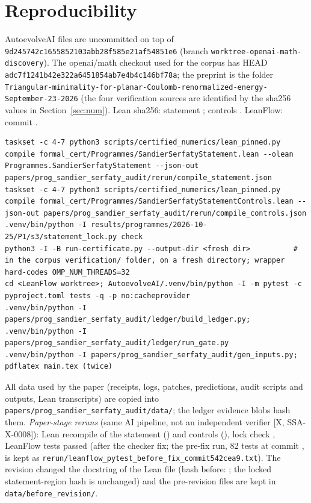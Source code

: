 \documentclass[10pt]{article}
\newcommand{\tier}[1]{\textsf{[#1]}}
\newcommand{\hash}[1]{\texttt{\expandafter\seqsplit\expandafter{#1}}}
\begin{document}
\section{Reproducibility}\label{sec:repro}
AutoevolveAI files are uncommitted on top of \texttt{9d245742c1655852103abb28f585e21af54851e6} (branch \texttt{worktree-openai-math-discovery}). The openai/math checkout used for the corpus has HEAD \texttt{adc7f1241b42e322a6451854ab7e4b4c146bf78a}; the preprint is the folder \texttt{Triangular-minimality-for-planar-Coulomb-renormalized-energy-September-23-2026} (the four verification sources are identified by the sha256 values in Section~\ref{sec:num}). Lean sha256: statement \hash{\SSAShaMain}; controls \hash{\SSAShaCtl}. LeanFlow: commit \hash{\SSALFCommit}.
\begin{lstlisting}[basicstyle=\ttfamily\tiny]
taskset -c 4-7 python3 scripts/certified_numerics/lean_pinned.py compile formal_cert/Programmes/SandierSerfatyStatement.lean --olean Programmes.SandierSerfatyStatement --json-out papers/prog_sandier_serfaty_audit/rerun/compile_statement.json
taskset -c 4-7 python3 scripts/certified_numerics/lean_pinned.py compile formal_cert/Programmes/SandierSerfatyStatementControls.lean --json-out papers/prog_sandier_serfaty_audit/rerun/compile_controls.json
.venv/bin/python -I results/programmes/2026-10-25/P1/s3/statement_lock.py check
python3 -I -B run-certificate.py --output-dir <fresh dir>          # in the corpus verification/ folder, on a fresh directory; wrapper hard-codes OMP_NUM_THREADS=32
cd <LeanFlow worktree>; AutoevolveAI/.venv/bin/python -I -m pytest -c pyproject.toml tests -q -p no:cacheprovider
.venv/bin/python -I papers/prog_sandier_serfaty_audit/ledger/build_ledger.py; .venv/bin/python -I papers/prog_sandier_serfaty_audit/ledger/run_gate.py
.venv/bin/python -I papers/prog_sandier_serfaty_audit/gen_inputs.py; pdflatex main.tex (twice)
\end{lstlisting}
All data used by the paper (receipts, logs, patches, predictions, audit scripts and outputs, Lean transcripts) are copied into \texttt{papers/prog\_sandier\_serfaty\_audit/data/}; the ledger evidence blobs hash them. \emph{Paper-stage reruns} (same AI pipeline, not an independent verifier \tier{X, SSA-X-0008}): Lean recompile of the statement (\SSACompileMain) and controls (\SSACompileCtl), lock check \texttt{\SSALockCheck}, LeanFlow \SSALFPassed{} tests passed (after the checker fix; the pre-fix run, 82 tests at commit \hash{\SSALFOldCommit}, is kept as \texttt{rerun/leanflow\_pytest\_before\_fix\_commit542cea9.txt}). The revision changed the docstring of the Lean file (hash before: \hash{\SSAShaMainOld}; the locked statement-region hash is unchanged) and the pre-revision files are kept in \texttt{data/before\_revision/}.
\end{document}
